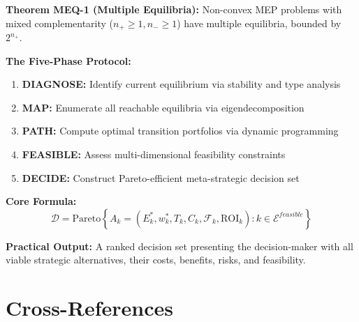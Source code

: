 \begin{tcolorbox}[colback=blue!5!white, colframe=blue!75!black,
    title=Key Results: Multiple Equilibria \& Strategic Navigation]

\textbf{Theorem MEQ-1 (Multiple Equilibria):}
Non-convex MEP problems with mixed complementarity ($n_+ \geq 1, n_- \geq 1$)
have multiple equilibria, bounded by $2^{n_+}$.

\textbf{The Five-Phase Protocol:}
\begin{enumerate}
    \item \textbf{DIAGNOSE:} Identify current equilibrium via stability and type analysis
    \item \textbf{MAP:} Enumerate all reachable equilibria via eigendecomposition
    \item \textbf{PATH:} Compute optimal transition portfolios via dynamic programming
    \item \textbf{FEASIBLE:} Assess multi-dimensional feasibility constraints
    \item \textbf{DECIDE:} Construct Pareto-efficient meta-strategic decision set
\end{enumerate}

\textbf{Core Formula:}
\begin{equation}
\mathcal{D} = \text{Pareto}\left\{ A_k = (E^*_k, w^*_k, T_k, C_k, \mathcal{F}_k, \text{ROI}_k) : k \in \mathcal{E}^{feasible} \right\}
\end{equation}

\textbf{Practical Output:} A ranked decision set presenting the decision-maker
with all viable strategic alternatives, their costs, benefits, risks, and feasibility.

\end{tcolorbox}

\section{Cross-References}
\label{sec:meq-crossref}

